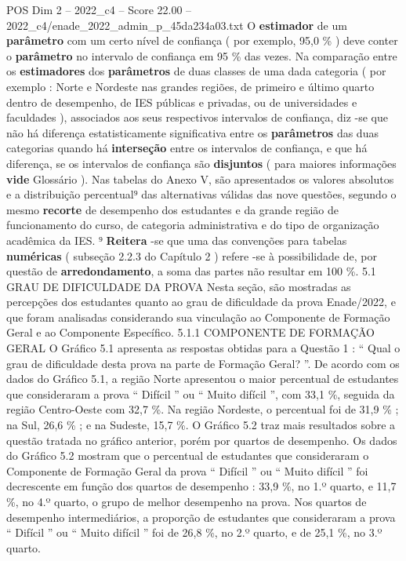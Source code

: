 \begin{textsample}{POS Dim 2 – 2022\_c4 – Score 22.00 – 2022\_c4/enade\_2022\_admin\_p\_45da234a03.txt}
O \textbf{estimador} de um \textbf{parâmetro} com um certo nível de confiança ( por exemplo, 95,0 \% ) deve conter o \textbf{parâmetro} no intervalo de confiança em 95 \% das vezes.
Na comparação entre os \textbf{estimadores} dos \textbf{parâmetros} de duas classes de uma dada categoria ( por exemplo : Norte e Nordeste nas grandes regiões, de primeiro e último quarto dentro de desempenho, de IES públicas e privadas, ou de universidades e faculdades ), associados aos seus respectivos intervalos de confiança, diz -se que não há diferença estatisticamente significativa entre os \textbf{parâmetros} das duas categorias quando há \textbf{interseção} entre os intervalos de confiança, e que há diferença, se os intervalos de confiança são \textbf{disjuntos} ( para maiores informações \textbf{vide} Glossário ).
Nas tabelas do Anexo V, são apresentados os valores absolutos e a distribuição percentual⁹ das alternativas válidas das nove questões, segundo o mesmo \textbf{recorte} de desempenho dos estudantes e da grande região de funcionamento do curso, de categoria administrativa e do tipo de organização acadêmica da IES. ⁹ \textbf{Reitera} -se que uma das convenções para tabelas \textbf{numéricas} ( subseção 2.2.3 do Capítulo 2 ) refere -se à possibilidade de, por questão de \textbf{arredondamento}, a soma das partes não resultar em 100 \%. 5.1 GRAU DE DIFICULDADE DA PROVA Nesta seção, são mostradas as percepções dos estudantes quanto ao grau de dificuldade da prova Enade/2022, e que foram analisadas considerando sua vinculação ao Componente de Formação Geral e ao Componente Específico. 5.1.1 COMPONENTE DE FORMAÇÃO GERAL O Gráfico 5.1 apresenta as respostas obtidas para a Questão 1 : “ Qual o grau de dificuldade desta prova na parte de Formação Geral? ”.
De acordo com os dados do Gráfico 5.1, a região Norte apresentou o maior percentual de estudantes que consideraram a prova “ Difícil ” ou “ Muito difícil ”, com 33,1 \%, seguida da região Centro-Oeste com 32,7 \%.
Na região Nordeste, o percentual foi de 31,9 \% ; na Sul, 26,6 \% ; e na Sudeste, 15,7 \%.
O Gráfico 5.2 traz mais resultados sobre a questão tratada no gráfico anterior, porém por quartos de desempenho.
Os dados do Gráfico 5.2 mostram que o percentual de estudantes que consideraram o Componente de Formação Geral da prova “ Difícil ” ou “ Muito difícil ” foi decrescente em função dos quartos de desempenho : 33,9 \%, no 1.º quarto, e 11,7 \%, no 4.º quarto, o grupo de melhor desempenho na prova.
Nos quartos de desempenho intermediários, a proporção de estudantes que consideraram a prova “ Difícil ” ou “ Muito difícil ” foi de 26,8 \%, no 2.º quarto, e de 25,1 \%, no 3.º quarto.

\end{textsample}
